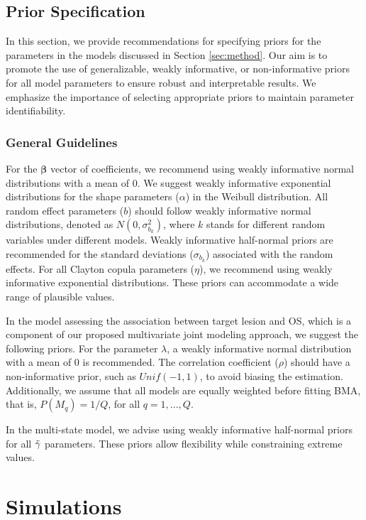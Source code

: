 \documentclass[aoas]{imsart}
\theoremstyle{plain}
\theoremstyle{remark}
\begin{document}
\subsection{Prior Specification}

In this section, we provide recommendations for specifying priors for the parameters in the models discussed in Section \ref{sec:method}. Our aim is to promote the use of generalizable, weakly informative, or non-informative priors for all model parameters to ensure robust and interpretable results. We emphasize the importance of selecting appropriate priors to maintain parameter identifiability.

\subsubsection{General Guidelines}

For the $\boldsymbol{\beta}$ vector of coefficients, we recommend using weakly informative normal distributions with a mean of 0. We suggest weakly informative exponential distributions for the shape parameters ($\alpha$) in the Weibull distribution. All random effect parameters ($b$) should follow weakly informative normal distributions, denoted as $N(0, \sigma_{b_k}^2)$, where $k$ stands for different random variables under different models. Weakly informative half-normal priors are recommended for the standard deviations ($\sigma_{b_k}$) associated with the random effects. For all Clayton copula parameters ($\eta$), we recommend using weakly informative exponential distributions. These priors can accommodate a wide range of plausible values.

In the model assessing the association between target lesion and OS, which is a component of our proposed multivariate joint modeling approach, we suggest the following priors. For the parameter $\lambda$, a weakly informative normal distribution with a mean of 0 is recommended. The correlation coefficient ($\rho$) should have a non-informative prior, such as $Unif(-1, 1)$, to avoid biasing the estimation. Additionally, we assume that all models are equally weighted before fitting BMA, that is, $P(M_q) = 1/Q$, for all $q = 1,...,Q$.

In the multi-state model, we advise using weakly informative half-normal priors for all $\Tilde{\gamma}$ parameters. These priors allow flexibility while constraining extreme values.




\section{Simulations}
\label{sec:simulation}
\end{document}

